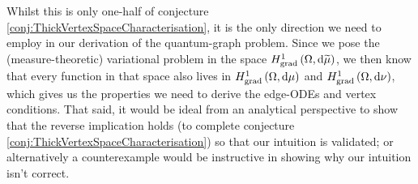Whilst this is only one-half of conjecture \ref{conj:ThickVertexSpaceCharacterisation}, it is the only direction we need to employ in our derivation of the quantum-graph problem.
Since we pose the (measure-theoretic) variational problem in the space $H^1_\mathrm{grad}\left( \Omega, \mathrm{d}\widetilde{\mu} \right)$, we then know that every function in that space also lives in $H^1_\mathrm{grad}\left( \Omega, \mathrm{d}\mu \right)$ and $H^1_\mathrm{grad}\left( \Omega, \mathrm{d}\nu \right)$, which gives us the properties we need to derive the edge-ODEs and vertex conditions.
That said, it would be ideal from an analytical perspective to show that the reverse implication holds (to complete conjecture \ref{conj:ThickVertexSpaceCharacterisation}) so that our intuition is validated; or alternatively a counterexample would be instructive in showing why our intuition isn't correct.
